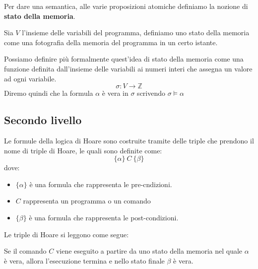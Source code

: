 Per dare una semantica, alle varie proposizioni atomiche definiamo la nozione di
\textbf{stato della memoria}.
\begin{definizione}
    Sia $V$ l'insieme delle variabili del programma, definiamo uno stato della
    memoria come una fotografia della memoria del programma in un certo istante.

    Possiamo definire più formalmente quest'idea di stato della memoria come una
    funzione definita dall'insieme delle variabili ai numeri interi che assegna
    un valore ad ogni variabile.
    \begin{equation}
        \sigma: V \to \mathbb{Z}
    \end{equation}
    Diremo quindi che la formula $\alpha$ è vera in $\sigma$ scrivendo $\sigma \models \alpha$
\end{definizione}
\subsection{Secondo livello}
Le formule della logica di Hoare sono costruite tramite delle triple che prendono
il nome di triple di Hoare, le quali sono definite come:
\begin{equation}
    \{\alpha\} \ C \ \{\beta\}
\end{equation}
dove:
\begin{itemize}
    \item $\{\alpha\}$ è una formula che rappresenta le pre-cndizioni.
    \item $C$ rappresenta un programma o un comando
    \item $\{\beta\}$ è una formula che rappresenta le post-condizioni.
\end{itemize}
Le triple di Hoare si leggono come segue:
\begin{center}
    Se il comando $C$ viene eseguito a partire da uno stato della memoria nel
    quale $\alpha$ è vera, allora l'esecuzione termina e nello stato finale $\beta$ è vera.
\end{center}
